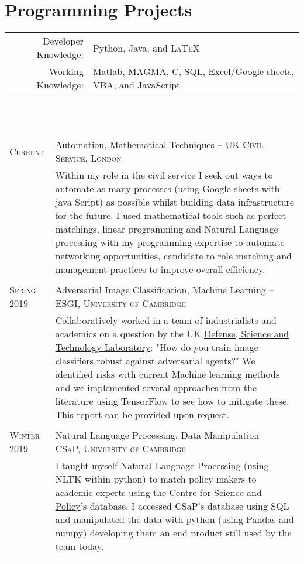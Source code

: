 \documentclass[a4paper,10pt]{article}
\begin{document}
\section{Programming Projects}
\begin{tabular}{rl}
	Developer Knowledge: &  Python, Java, and \textsc{LaTeX}\\
	Working Knowledge: & Matlab, \textsc{MAGMA}, C, SQL, Excel/Google sheets, VBA, and JavaScript\\
\end{tabular}\\
\vspace{0.1 in}\\
\begin{tabular}{p{2.25cm}|p{15cm}}
	\textsc{Current}  & Automation, Mathematical Techniques -- \textsc{UK Civil Service, London} \\&\footnotesize{Within my role in the civil service I seek out ways to automate as many processes (using Google sheets with java Script) as possible whilst building data infrastructure for the future. I used mathematical tools such as perfect matchings, linear programming and Natural Language processing with my programming expertise to automate networking opportunities, candidate to role matching and management practices to improve overall efficiency.}\\\multicolumn{2}{c}{} \\
	\textsc{Spring 2019} & Adversarial Image Classification, Machine Learning -- \textsc{ESGI, University of Cambridge} \\&\footnotesize{Collaboratively worked in a team of industrialists and academics on a question by the UK \href{https://www.gov.uk/government/organisations/defence-science-and-technology-laboratory}{Defense, Science and Technology Laboratory}: "How do you train image classifiers robust against adversarial agents?" We identified risks with current Machine learning methods and we implemented several approaches from the literature using TensorFlow to see how to mitigate these. This report can be provided upon request.}\\\multicolumn{2}{c}{} \\
	\textsc{Winter 2019} & Natural Language Processing, Data Manipulation -- \textsc{CSaP, University of Cambridge}\\&\footnotesize{I taught myself Natural Language Processing (using NLTK within python) to match policy makers to academic experts using the \href{https://www.csap.cam.ac.uk/}{Centre for Science and Policy}'s database. I accessed CSaP's database using SQL and manipulated the data with python (using Pandas and numpy) developing them an end product still used by the team today.}\\\multicolumn{2}{c}{} \\

\end{tabular}
\end{document}
